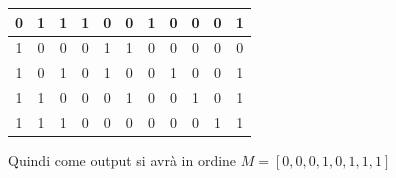 \documentclass[a4paper,12pt, oneside]{book}
\begin{document}
\begin{esercizio}
\begin{center}
\begin{tabular}{|c|c|c|c|c|c|c|c|c|c|c|}
			0   & 1   & 1   & 1              & 0              & 0              & 1                              & 0                              & 0                             & 0                   & 1            \\
			\hline
			1   & 0   & 0   & 0              & 1              & 1              & 0                              & 0                              & 0                             & 0                   & 0            \\
			\hline
			1   & 0   & 1   & 0              & 1              & 0              & 0                              & 1                              & 0                             & 0                   & 1            \\
			\hline
			1   & 1   & 0   & 0              & 0              & 1              & 0                              & 0                              & 1                             & 0                   & 1            \\
			\hline
			1   & 1   & 1   & 0              & 0              & 0              & 0                              & 0                              & 0                             & 1                   & 1            \\
			\hline
		\end{tabular}
	\end{center}
	Quindi come output si avrà in ordine $M=[0,0,0,1,0,1,1,1]$
\end{esercizio}
\newpage
\end{document}
